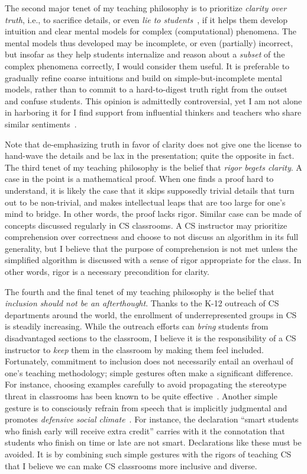 The second major tenet of my teaching philosophy is to prioritize
\emph{clarity over truth}, i.e., to sacrifice details, or even
\emph{lie to students}~\cite{lietokids}, if it helps them develop
intuition and clear mental models for complex (computational)
phenomena. The mental models thus developed may be incomplete, or even
(partially) incorrect, but insofar as they help students internalize
and reason about a \emph{subset} of the complex phenomena correctly, I
would consider them useful. It is preferable to gradually refine
coarse intuitions and build on simple-but-incomplete mental models,
rather than to commit to a hard-to-digest truth right from the outset
and confuse students. This opinion is admittedly controversial, yet I
am not alone in harboring it for I find support from influential
thinkers and teachers who share similar
sentiments~\cite{ladder,lietokids, ttt}.

Note that de-emphasizing truth in favor of clarity does not give one
the license to hand-wave the details and be lax in the presentation;
quite the opposite in fact. The third tenet of my teaching philosophy
is the belief that \emph{rigor begets clarity}. A case in the point is
a mathematical proof. When one finds a proof hard to understand, it is
likely the case that it skips supposedly trivial details that turn out
to be non-trivial, and makes intellectual leaps that are too large for
one's mind to bridge. In other words, the proof lacks rigor. Similar
case can be made of concepts discussed regularly in CS classrooms. A
CS instructor may prioritize comprehension over correctness and choose
to not discuss an algorithm in its full generality, but I believe that
the purpose of comprehension is not met unless the simplified
algorithm is discussed with a sense of rigor appropriate for the
class. In other words, rigor is a necessary precondition for clarity.

The fourth and the final tenet of my teaching philosophy is the belief
that \emph{inclusion should not be an afterthought}. Thanks to the
K-12 outreach of CS departments around the world, the enrollment of
underrepresented groups in CS is steadily increasing.  While the
outreach efforts can \emph{bring} students from disadvantaged sections
to the classroom, I believe it is the responsibility of a CS
instructor to \emph{keep} them in the classroom by making them feel
included. Fortunately, commitment to inclusion does not necessarily
entail an overhaul of one's teaching methodology; simple gestures
often make a significant difference. For instance, choosing examples
carefully to avoid propagating the stereotype threat in classrooms has
been known to be quite effective~\cite{MA07,SG11}. Another simple
gesture is to consciously refrain from speech that is implicitly
judgmental and promotes \emph{defensive social climate}~\cite{BGJ02}.
For instance, the declaration ``smart students who finish early will
receive extra credit'' carries with it the connotation that students
who finish on time or late are not smart. Declarations like these must
be avoided.  It is by combining such simple gestures with the rigors
of teaching CS that I believe we can make CS classrooms more inclusive
and diverse.

